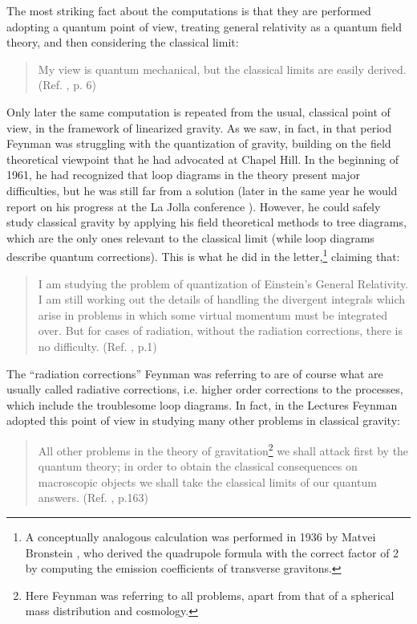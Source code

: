 \documentclass{ws-procs961x669}            %
\begin{document}
The most striking fact about the computations is that they are
performed adopting a quantum point of view, treating general
relativity as a quantum field theory, and then considering the
classical limit:
\begin{quote}
My view is quantum mechanical, but the classical limits are easily
derived. (Ref. , p. 6)
\end{quote}
Only later the same computation is repeated from the usual,
classical point of view, in the framework of linearized gravity.
As we saw, in fact, in that period Feynman was struggling with the
quantization of gravity, building on the field theoretical
viewpoint that he had advocated at Chapel Hill. In the beginning
of 1961, he had recognized that loop diagrams in the theory
present major difficulties, but he was still far from a solution
(later in the same year he would report on his progress at the La
Jolla conference \cite{LaJolla}). However, he could safely study
classical gravity by applying his field theoretical methods to
tree diagrams, which are the only ones relevant to the classical
limit (while loop diagrams describe quantum corrections). This is
what he did in the letter,\footnote{A conceptually analogous
calculation was performed in 1936 by Matvei Bronstein
\cite{Bronstein}, who derived the quadrupole formula with the
correct factor of 2 by computing the emission coefficients of
transverse gravitons.} claiming that:
%
\begin{quote}
I am studying the problem of quantization of Einstein's General
Relativity. I am still working out the details of handling the
divergent integrals which arise in problems in which some virtual
momentum must be integrated over. But for cases of radiation,
without the radiation corrections, there is no difficulty. (Ref.
, p.1)
\end{quote}
%
The ``radiation corrections'' Feynman was referring to are of
course what are usually called radiative corrections, i.e. higher
order corrections to the processes, which include the troublesome
loop diagrams. In fact, in the Lectures Feynman adopted this point
of view in studying many other problems in classical gravity:
\begin{quote}
All other problems in the theory of gravitation\footnote{Here
Feynman was referring to all problems, apart from that of a
spherical mass distribution and cosmology.} we shall attack first
by the quantum theory; in order to obtain the classical
consequences on macroscopic objects we shall take the classical
limits of our quantum answers. (Ref. ,
p.163)
\end{quote}
\end{document}

